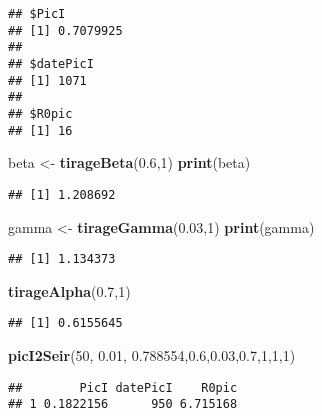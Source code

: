 \documentclass[
]{article}
\newenvironment{Shaded}{\begin{snugshade}}{\end{snugshade}}
\newcommand{\DecValTok}[1]{\textcolor[rgb]{0.00,0.00,0.81}{#1}}
\newcommand{\FloatTok}[1]{\textcolor[rgb]{0.00,0.00,0.81}{#1}}
\newcommand{\KeywordTok}[1]{\textcolor[rgb]{0.13,0.29,0.53}{\textbf{#1}}}
\newcommand{\NormalTok}[1]{#1}
\newcommand{\StringTok}[1]{\textcolor[rgb]{0.31,0.60,0.02}{#1}}
\begin{document}
\begin{verbatim}
## $PicI
## [1] 0.7079925
## 
## $datePicI
## [1] 1071
## 
## $R0pic
## [1] 16
\end{verbatim}

\begin{Shaded}
\begin{Highlighting}[]
\NormalTok{beta <-}\StringTok{ }\KeywordTok{tirageBeta}\NormalTok{(}\FloatTok{0.6}\NormalTok{,}\DecValTok{1}\NormalTok{)}
\KeywordTok{print}\NormalTok{(beta)}
\end{Highlighting}
\end{Shaded}

\begin{verbatim}
## [1] 1.208692
\end{verbatim}

\begin{Shaded}
\begin{Highlighting}[]
\NormalTok{gamma <-}\StringTok{ }\KeywordTok{tirageGamma}\NormalTok{(}\FloatTok{0.03}\NormalTok{,}\DecValTok{1}\NormalTok{)}
\KeywordTok{print}\NormalTok{(gamma)}
\end{Highlighting}
\end{Shaded}

\begin{verbatim}
## [1] 1.134373
\end{verbatim}

\begin{Shaded}
\begin{Highlighting}[]
\KeywordTok{tirageAlpha}\NormalTok{(}\FloatTok{0.7}\NormalTok{,}\DecValTok{1}\NormalTok{)}
\end{Highlighting}
\end{Shaded}

\begin{verbatim}
## [1] 0.6155645
\end{verbatim}

\begin{Shaded}
\begin{Highlighting}[]
\KeywordTok{picI2Seir}\NormalTok{(}\DecValTok{50}\NormalTok{, }\FloatTok{0.01}\NormalTok{, }\FloatTok{0.788554}\NormalTok{,}\FloatTok{0.6}\NormalTok{,}\FloatTok{0.03}\NormalTok{,}\FloatTok{0.7}\NormalTok{,}\DecValTok{1}\NormalTok{,}\DecValTok{1}\NormalTok{,}\DecValTok{1}\NormalTok{)}
\end{Highlighting}
\end{Shaded}

\begin{verbatim}
##        PicI datePicI    R0pic
## 1 0.1822156      950 6.715168
\end{verbatim}
\end{document}
